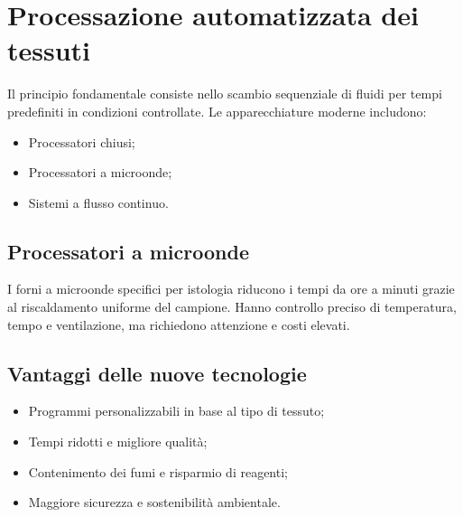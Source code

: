 \section{Processazione automatizzata dei tessuti}
Il principio fondamentale consiste nello scambio sequenziale di fluidi per tempi predefiniti in condizioni controllate.  
Le apparecchiature moderne includono:
\begin{itemize}
    \item Processatori chiusi;
    \item Processatori a microonde;
    \item Sistemi a flusso continuo.
\end{itemize}

\subsection{Processatori a microonde}
I forni a microonde specifici per istologia riducono i tempi da ore a minuti grazie al riscaldamento uniforme del campione. Hanno controllo preciso di temperatura, tempo e ventilazione, ma richiedono attenzione e costi elevati.

\subsection{Vantaggi delle nuove tecnologie}
\begin{itemize}
    \item Programmi personalizzabili in base al tipo di tessuto;
    \item Tempi ridotti e migliore qualità;
    \item Contenimento dei fumi e risparmio di reagenti;
    \item Maggiore sicurezza e sostenibilità ambientale.
\end{itemize}




